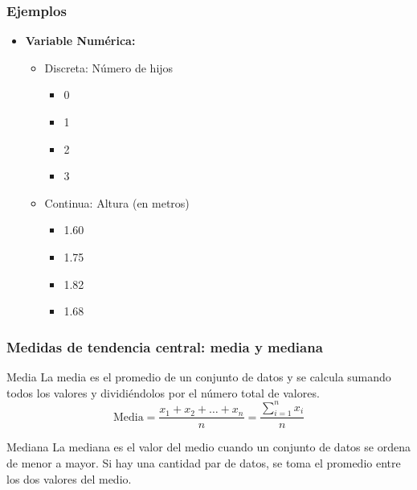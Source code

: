 \documentclass[aspectratio=169,12pt]{beamer}
\begin{document}
\begin{frame}
\frametitle{Ejemplos}
\begin{itemize}
    \item \textbf{Variable Numérica:}
    \begin{itemize}
        \item Discreta: Número de hijos
        \begin{itemize}
            \item 0
            \item 1
            \item 2
            \item 3
        \end{itemize}
        \item Continua: Altura (en metros)
        \begin{itemize}
            \item 1.60
            \item 1.75
            \item 1.82
            \item 1.68
        \end{itemize}
    \end{itemize}
\end{itemize}

\end{frame}



\begin{frame}
\frametitle{Medidas de tendencia central: media y mediana}
\begin{block}{Media}
La media es el promedio de un conjunto de datos y se calcula sumando todos los valores y dividiéndolos por el número total de valores.
\[ \text{Media} = \frac{x_1 + x_2 + \dots + x_n}{n} = \frac{\sum_{i=1}^{n} x_i}{n} \]
\end{block}

\begin{block}{Mediana}
La mediana es el valor del medio cuando un conjunto de datos se ordena de menor a mayor. Si hay una cantidad par de datos, se toma el promedio entre los dos valores del medio.
\end{block}
\end{frame}

\end{document}
